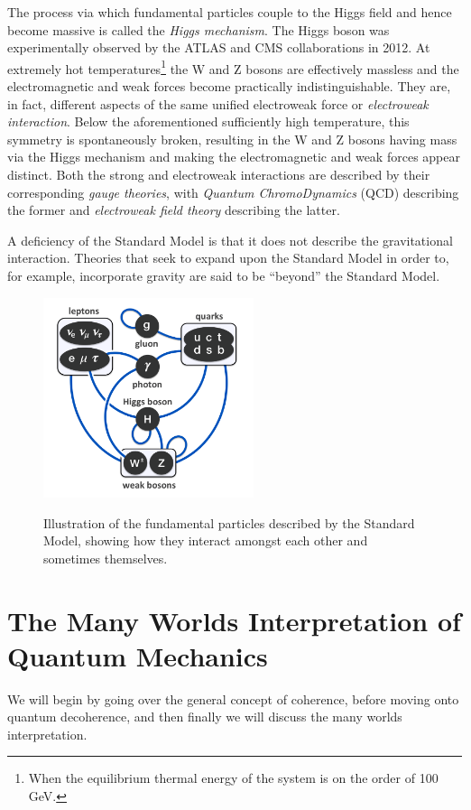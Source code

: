 \documentclass{article}
\begin{document}
The process via which fundamental particles couple to the Higgs field and hence become massive is called the \emph{Higgs mechanism}. The Higgs boson was experimentally observed by the ATLAS and CMS collaborations in 2012. At extremely hot temperatures\footnote{When the equilibrium thermal energy of the system is on the order of 100 GeV.} the W and Z bosons are effectively massless and the electromagnetic and weak forces become practically indistinguishable. They are, in fact, different aspects of the same unified electroweak force or \emph{electroweak interaction}. Below the aforementioned sufficiently high temperature, this symmetry is spontaneously broken, resulting in the W and Z bosons having mass via the Higgs mechanism and making the electromagnetic and weak forces appear distinct. Both the strong and electroweak interactions are described by their corresponding \emph{gauge theories}, with \emph{Quantum ChromoDynamics} (QCD) describing the former and \emph{electroweak field theory} describing the latter.

A deficiency of the Standard Model is that it does not describe the gravitational interaction. Theories that seek to expand upon the Standard Model in order to, for example, incorporate gravity are said to be ``beyond'' the Standard Model.
\begin{figure}[h]
\centering
\includegraphics[width=0.55\textwidth]{../thesis/images/fund_part_in_sm.png}
\label{sm_part_image}
\caption{Illustration of the fundamental particles described by the Standard Model, showing how they interact amongst each other and sometimes themselves.}
\end{figure}
\newpage
\section{The Many Worlds Interpretation of Quantum Mechanics}
We will begin by going over the general concept of coherence, before moving onto quantum decoherence, and then finally we will discuss the many worlds interpretation.
\end{document}
